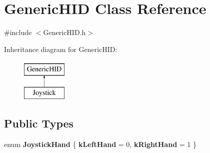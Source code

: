 \hypertarget{classGenericHID}{\section{\-Generic\-H\-I\-D \-Class \-Reference}
\label{classGenericHID}
}


{\ttfamily \#include $<$\-Generic\-H\-I\-D.\-h$>$}

\-Inheritance diagram for \-Generic\-H\-I\-D\-:\begin{figure}[H]
\begin{center}
\leavevmode
\includegraphics[height=2.000000cm]{classGenericHID}
\end{center}
\end{figure}
\subsection*{\-Public \-Types}
\begin{DoxyCompactItemize}
\item 
enum {\bfseries \-Joystick\-Hand} \{ {\bfseries k\-Left\-Hand} =  0, 
{\bfseries k\-Right\-Hand} =  1
 \}
\end{DoxyCompactItemize}

